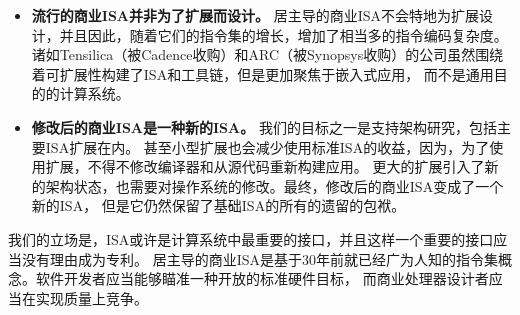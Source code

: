 \begin{itemize}
\item {\bf 流行的商业ISA并非为了扩展而设计。} 居主导的商业ISA不会特地为扩展设计，并且因此，随着它们的指令集的增长，增加了相当多的指令编码复杂度。
  诸如Tensilica（被Cadence收购）和ARC（被Synopsys收购）的公司虽然围绕着可扩展性构建了ISA和工具链，但是更加聚焦于嵌入式应用，
  而不是通用目的的计算系统。

\item {\bf 修改后的商业ISA是一种新的ISA。} 我们的目标之一是支持架构研究，包括主要ISA扩展在内。
甚至小型扩展也会减少使用标准ISA的收益，因为，为了使用扩展，不得不修改编译器和从源代码重新构建应用。
更大的扩展引入了新的架构状态，也需要对操作系统的修改。最终，修改后的商业ISA变成了一个新的ISA，
但是它仍然保留了基础ISA的所有的遗留的包袱。
\end{itemize}

我们的立场是，ISA或许是计算系统中最重要的接口，并且这样一个重要的接口应当没有理由成为专利。
居主导的商业ISA是基于30年前就已经广为人知的指令集概念。软件开发者应当能够瞄准一种开放的标准硬件目标，
而商业处理器设计者应当在实现质量上竞争。

